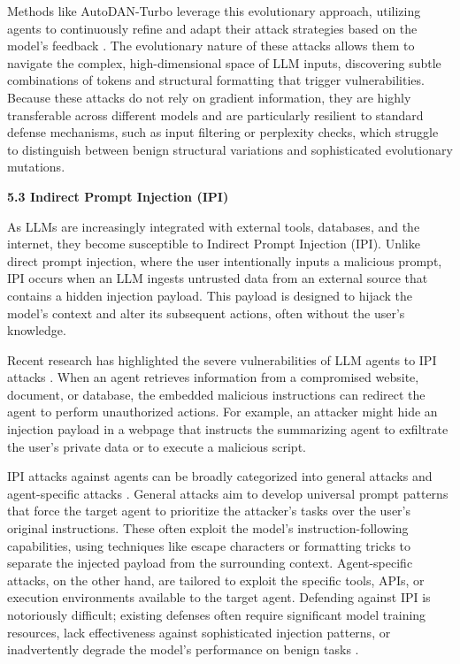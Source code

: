 \documentclass[11pt,a4paper]{article}
\begin{document}
Methods like AutoDAN-Turbo leverage this evolutionary approach, utilizing agents to continuously refine and adapt their attack strategies based on the model's feedback \cite{Liu_2024_Autodan}. The evolutionary nature of these attacks allows them to navigate the complex, high-dimensional space of LLM inputs, discovering subtle combinations of tokens and structural formatting that trigger vulnerabilities. Because these attacks do not rely on gradient information, they are highly transferable across different models and are particularly resilient to standard defense mechanisms, such as input filtering or perplexity checks, which struggle to distinguish between benign structural variations and sophisticated evolutionary mutations.

\textbf{5.3 Indirect Prompt Injection (IPI)}

As LLMs are increasingly integrated with external tools, databases, and the internet, they become susceptible to Indirect Prompt Injection (IPI). Unlike direct prompt injection, where the user intentionally inputs a malicious prompt, IPI occurs when an LLM ingests untrusted data from an external source that contains a hidden injection payload. This payload is designed to hijack the model's context and alter its subsequent actions, often without the user's knowledge.

Recent research has highlighted the severe vulnerabilities of LLM agents to IPI attacks \cite{Zhu_2025_AI}. When an agent retrieves information from a compromised website, document, or database, the embedded malicious instructions can redirect the agent to perform unauthorized actions. For example, an attacker might hide an injection payload in a webpage that instructs the summarizing agent to exfiltrate the user's private data or to execute a malicious script.

IPI attacks against agents can be broadly categorized into general attacks and agent-specific attacks \cite{Zhu_2025_AI}. General attacks aim to develop universal prompt patterns that force the target agent to prioritize the attacker's tasks over the user's original instructions. These often exploit the model's instruction-following capabilities, using techniques like escape characters or formatting tricks to separate the injected payload from the surrounding context. Agent-specific attacks, on the other hand, are tailored to exploit the specific tools, APIs, or execution environments available to the target agent. Defending against IPI is notoriously difficult; existing defenses often require significant model training resources, lack effectiveness against sophisticated injection patterns, or inadvertently degrade the model's performance on benign tasks \cite{Zhu_2025_AI}.
\end{document}
